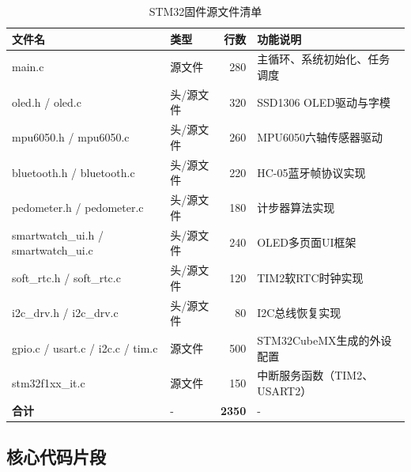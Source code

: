 \begin{table}[h]
    \centering
    \caption{STM32固件源文件清单}
    \label{tab:ap_codefiles}
    \begin{tabular}{|l|l|r|l|}
        \hline
        \textbf{文件名} & \textbf{类型} & \textbf{行数} & \textbf{功能说明} \\ \hline
        main.c & 源文件 & 280 & 主循环、系统初始化、任务调度 \\ \hline
        oled.h / oled.c & 头/源文件 & 320 & SSD1306 OLED驱动与字模 \\ \hline
        mpu6050.h / mpu6050.c & 头/源文件 & 260 & MPU6050六轴传感器驱动 \\ \hline
        bluetooth.h / bluetooth.c & 头/源文件 & 220 & HC-05蓝牙帧协议实现 \\ \hline
        pedometer.h / pedometer.c & 头/源文件 & 180 & 计步器算法实现 \\ \hline
        smartwatch\_ui.h / smartwatch\_ui.c & 头/源文件 & 240 & OLED多页面UI框架 \\ \hline
        soft\_rtc.h / soft\_rtc.c & 头/源文件 & 120 & TIM2软RTC时钟实现 \\ \hline
        i2c\_drv.h / i2c\_drv.c & 头/源文件 & 80 & I2C总线恢复实现 \\ \hline
        gpio.c / usart.c / i2c.c / tim.c & 源文件 & 500 & STM32CubeMX生成的外设配置 \\ \hline
        stm32f1xx\_it.c & 源文件 & 150 & 中断服务函数（TIM2、USART2） \\ \hline
        \textbf{合计} & - & \textbf{2350} & - \\ \hline
    \end{tabular}
\end{table}

\FloatBarrier

\subsection{核心代码片段}

